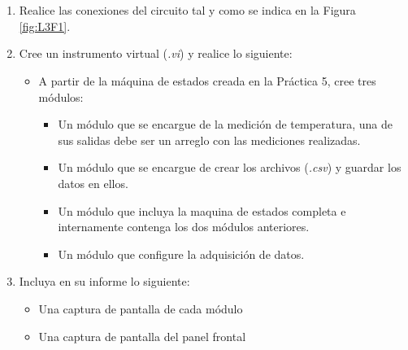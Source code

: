 \section{\pro}
\begin{enumerate}
\item Realice las conexiones del circuito tal y como se indica en la Figura \ref{fig:L3F1}.
\item Cree un instrumento virtual (\emph{.vi}) y realice lo siguiente:
    \begin{itemize}
        \item A partir de la máquina de estados creada en la Práctica 5, cree tres módulos:
            \begin{itemize}
                \item Un módulo que se encargue de la medición de temperatura, una de sus salidas debe ser un arreglo con las mediciones realizadas.  
                \item Un módulo que se encargue de crear los archivos (\emph{.csv}) y guardar los datos en ellos. 
                \item Un módulo que incluya la maquina de estados completa e internamente contenga los dos módulos anteriores.
                \item Un módulo que configure la adquisición de datos.
            \end{itemize}
    \end{itemize}

\item Incluya en su informe lo siguiente:
    \begin{itemize}
        \item Una captura de pantalla de cada módulo 
        \item Una captura de pantalla del panel frontal
    \end{itemize}
    
\end{enumerate}
